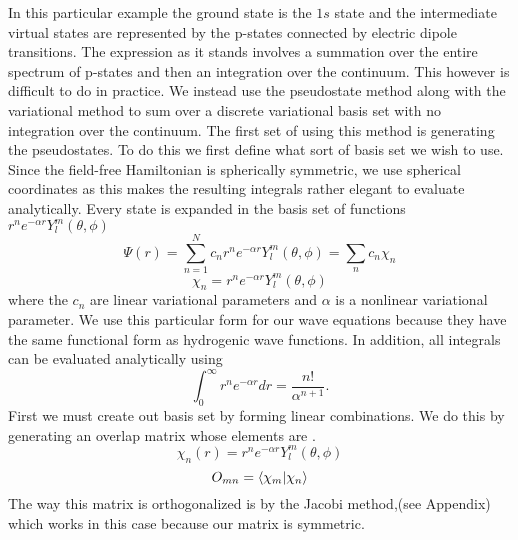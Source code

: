 

        
In this particular example the ground state is the \(1s\) state and the intermediate virtual states are represented by the p-states connected by electric dipole transitions. The expression as it stands involves a summation over the entire spectrum of p-states and then an integration over the continuum. This however is difficult to do in practice. We instead use the pseudostate method along with the variational method to sum over a discrete variational basis set with no integration over the continuum.
	The first set of using this method is generating the pseudostates. To do this we first define what sort of basis set we wish to use. Since the field-free Hamiltonian is spherically symmetric, we use spherical coordinates as this makes the resulting integrals rather elegant to evaluate analytically. Every state is expanded in the basis set of functions \(r^n e^{-\alpha r}Y_l^m(\theta,\phi)\) \cite{shark}
	\begin{equation}
    \Psi(r)=\sum_{n=1}^{N}c_{n}r^{n}e^{-\alpha r}Y_{l}^{m}(\theta,\phi)
    =\sum_n c_n \chi_n
    \end{equation}
    \begin{equation}
        \chi_n=r^n e^{-\alpha r}Y_l^m(\theta,\phi)
    \end{equation}
    where the \(c_{n}\) are linear variational parameters and \(\alpha\) is a nonlinear variational parameter. We use this particular form for our wave equations because they have the same functional form as hydrogenic wave functions. In addition, all integrals can be evaluated analytically using
    \begin{equation}
        \int_{0}^{\infty}r^{n}e^{-\alpha r}dr=\frac{n!}{\alpha^{n+1}}.
    \end{equation}
 First we must create out basis set by forming linear combinations. We do this by generating an overlap matrix whose elements are \cite{shark}.
 \begin{equation}
     \chi_{n}(r)=r^{n}e^{-\alpha r}Y_{l}^{m}(\theta,\phi)
 \end{equation}
 \begin{equation}
     O_{mn}=\bra{\chi_{m}}\ket{\chi_{n}}
 \end{equation}
  The way this matrix is orthogonalized is by the Jacobi method,(see Appendix) which works in this case because our matrix is symmetric. 


